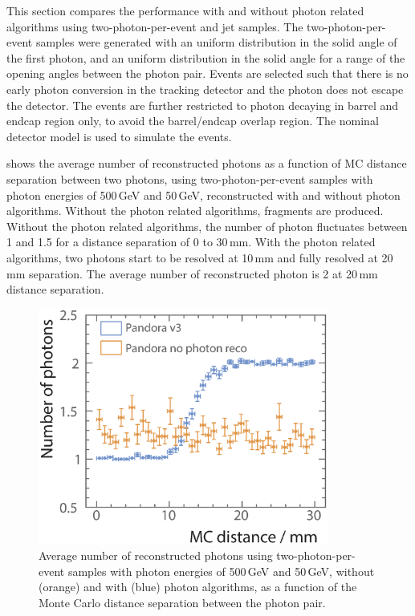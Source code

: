This section compares the performance with and without photon related algorithms using  two-photon-per-event and jet samples. The two-photon-per-event samples were generated with an uniform distribution in the solid angle of the first photon, and an uniform distribution in the solid angle  for a range of the opening angles  between the photon pair. Events are selected such that there is no early photon conversion in the tracking detector and the photon does not escape the detector. The events are further restricted to photon decaying in barrel and endcap region only, to avoid the barrel/endcap overlap region. The nominal \ILD detector model is used to simulate the events.


 shows the average number of reconstructed photons as a function of MC distance separation between two photons,   using  two-photon-per-event samples
with photon energies of  500\,GeV and 50\,GeV,   reconstructed with and without photon algorithms. Without the photon related algorithms, fragments are produced.  Without the photon related algorithms, the number of photon fluctuates between 1 and 1.5 for a distance separation of 0 to 30\,mm.   With the photon related algorithms, two photons start to be resolved at 10\,mm and fully resolved at 20\,mm separation.  The average number of reconstructed photon is 2 at 20\,mm distance separation.


\begin{figure}[tbph]
\centering
\includegraphics[width=0.85\textwidth]{photon/nPhotonVSnoPhotonReco2}
\caption[Average number of photons using two photons of 500 and 50\,GeV per event sample.]
{Average number of reconstructed  photons using two-photon-per-event samples with photon energies of  500\,GeV and 50\,GeV, without (orange) and with (blue) photon algorithms, as a function of the Monte Carlo distance separation between the photon pair.}
\label{fig:photonDoublePerformanceNoReco}
\end{figure}




